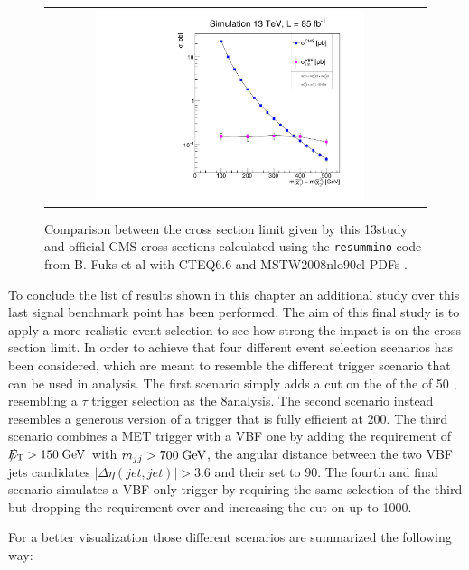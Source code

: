 \begin{figure}[tbh!]
	\centering
	\begin{tabular}{cc}
		\includegraphics[width=0.75\textwidth]{analysis/pics/out_xsecmin_lspcomp_stauclose.pdf}
	\end{tabular}
	\caption{Comparison between the cross section limit given by this 13\tev study and official CMS cross sections calculated using the \texttt{resummino} code from B. Fuks et al with CTEQ6.6 and MSTW2008nlo90cl PDFs \cite{Fuks:2013vua}.}
	\label{fig:xsec_confront_13tev}
\end{figure}


To conclude the list of results shown in this chapter an additional study over this last signal benchmark point has been performed. The aim of this final study is to apply a more realistic event selection to see how strong the impact is on the cross section limit. In order to achieve that four different event selection scenarios has been considered, which are meant to resemble the different trigger scenario that can be used in analysis. The first scenario simply adds a cut on the \pt of the \hadtau of 50 \gev, resembling a $\tau$ trigger selection as the 8\tev analysis. The second scenario instead resembles a generous  version of a \met trigger that is fully efficient at 200\gev. The third scenario combines a MET trigger with a VBF one by adding the requirement of $\slash\mkern-12mu{E}_{\text{T}} > 150\;\text{Ge}\kern-0.06667em\text{V}$  with $m_{jj} > 700\;\text{Ge}\kern-0.06667em\text{V}$, the angular distance between the two VBF jets candidates $|\Delta\eta(jet,jet)| > 3.6$ and their \pt set to 90\gev.  The fourth and final scenario simulates a VBF only trigger by requiring the same selection of the third but dropping the requirement over \met and increasing the cut on \mjj up to 1000\gev. 

For a better visualization those different scenarios are summarized the following way:

